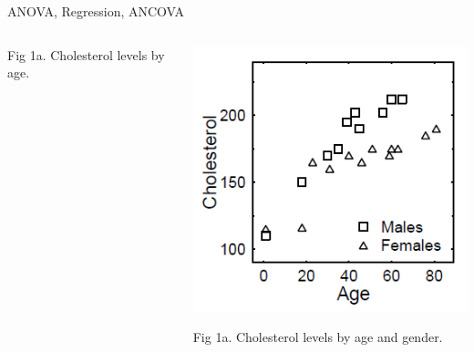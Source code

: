 \documentclass[presentation]{beamer}
\begin{document}
\begin{frame}[label={sec:org5caa19b}]{ANOVA, Regression, ANCOVA}
\begin{columns}
\begin{column}[t]{.33\columnwidth}
\begin{center}\begin{scriptsize}
Fig 1a.  Cholesterol levels by age.
\end{scriptsize}\end{center}
\end{column}

\begin{column}[t]{.34\columnwidth}
\includegraphics[width=.9\linewidth]{08_glm_img/CholesterolByGenderAge.png}

\begin{center}\begin{scriptsize}
Fig 1a.  Cholesterol levels by age and gender.
\end{scriptsize}\end{center}
\end{column}
\end{columns}
\end{frame}
\end{document}
